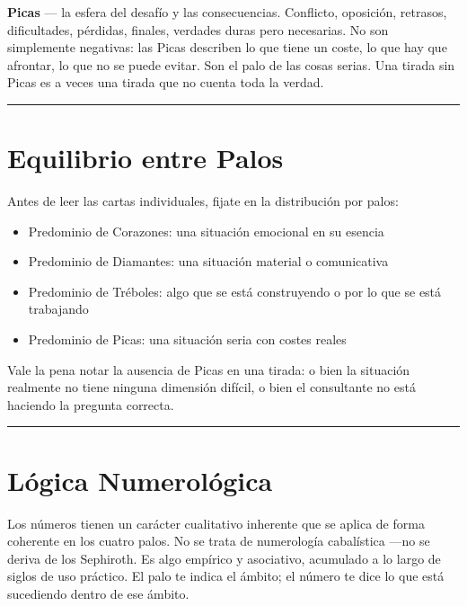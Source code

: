 \textbf{Picas} --- la esfera del desafío y las consecuencias. Conflicto, oposición, retrasos, dificultades, pérdidas, finales, verdades duras pero necesarias. No son simplemente negativas: las Picas describen lo que tiene un coste, lo que hay que afrontar, lo que no se puede evitar. Son el palo de las cosas serias. Una tirada sin Picas es a veces una tirada que no cuenta toda la verdad.

\begin{center}\rule{0.5\linewidth}{0.5pt}\end{center}

\section{Equilibrio entre Palos}\label{suit-balance}

Antes de leer las cartas individuales, fijate en la distribución por palos:

\begin{itemize}
\tightlist
\item
  Predominio de Corazones: una situación emocional en su esencia
\item
  Predominio de Diamantes: una situación material o comunicativa
\item
  Predominio de Tréboles: algo que se está construyendo o por lo que se está trabajando
\item
  Predominio de Picas: una situación seria con costes reales
\end{itemize}

Vale la pena notar la ausencia de Picas en una tirada: o bien la situación realmente no tiene ninguna dimensión difícil, o bien el consultante no está haciendo la pregunta correcta.

\begin{center}\rule{0.5\linewidth}{0.5pt}\end{center}

\section{Lógica Numerológica}\label{numerological-logic}

Los números tienen un carácter cualitativo inherente que se aplica de forma coherente en los cuatro palos. No se trata de numerología cabalística ---no se deriva de los Sephiroth. Es algo empírico y asociativo, acumulado a lo largo de siglos de uso práctico. El palo te indica el ámbito; el número te dice lo que está sucediendo dentro de ese ámbito.

